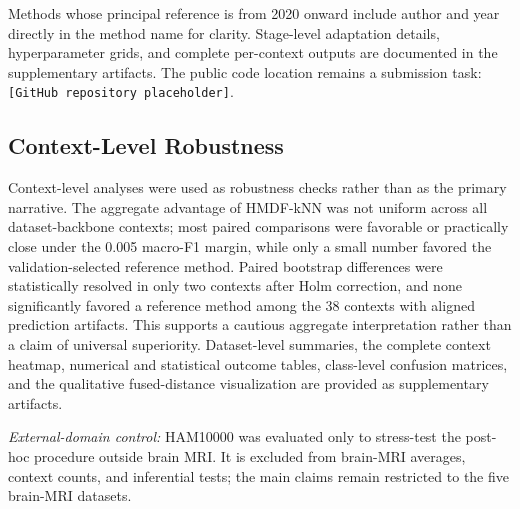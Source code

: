 \documentclass[main.tex]{subfiles}
\begin{document}
Methods whose principal reference is from 2020 onward include author and
year directly in the method name for clarity. Stage-level adaptation details,
hyperparameter grids, and complete per-context outputs are documented in the
supplementary artifacts. The public code location remains a submission task:
\texttt{[GitHub repository placeholder]}.

\FloatBarrier
\clearpage
\subsection{Context-Level Robustness}

Context-level analyses were used as robustness checks rather than as the
primary narrative. The aggregate advantage of HMDF-kNN was not uniform
across all dataset-backbone contexts; most paired comparisons were favorable
or practically close under the 0.005 macro-F1 margin, while only a small
number favored the validation-selected reference method. Paired bootstrap
differences were statistically resolved in only two contexts after Holm
correction, and none significantly favored a reference method among the 38
contexts with aligned prediction artifacts. This supports a cautious
aggregate interpretation rather than a claim of universal superiority.
Dataset-level summaries, the complete context heatmap, numerical and
statistical outcome tables, class-level confusion matrices, and the
qualitative fused-distance visualization are provided as supplementary
artifacts.

\textit{External-domain control:} HAM10000 was evaluated only to stress-test
the post-hoc procedure outside brain MRI. It is excluded from brain-MRI
averages, context counts, and inferential tests; the main claims remain
restricted to the five brain-MRI datasets.
\end{document}
